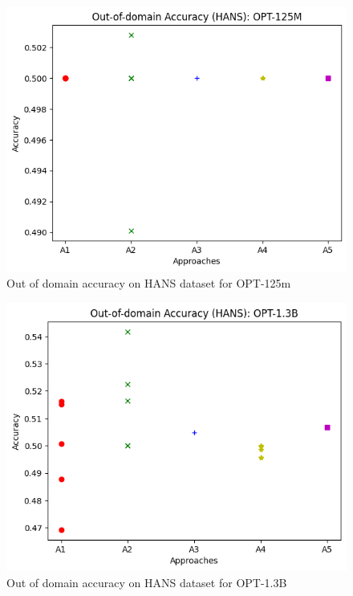 \documentclass[10pt,twocolumn,letterpaper]{article}
\begin{document}
\begin{figure}[H]
\begin{center}
\includegraphics[width=0.8\linewidth]{figures/out-of-domain-opt-125m.png}
\end{center}
\caption{Out of domain accuracy on HANS dataset for OPT-125m}
\end{figure}

\begin{figure}[H]
    \begin{center}
    \includegraphics[width=0.8\linewidth]{figures/out-of-domain-opt-1_3b.png}
    \end{center}
    \caption{Out of domain accuracy on HANS dataset for OPT-1.3B}
    \end{figure}
    
\end{document}
